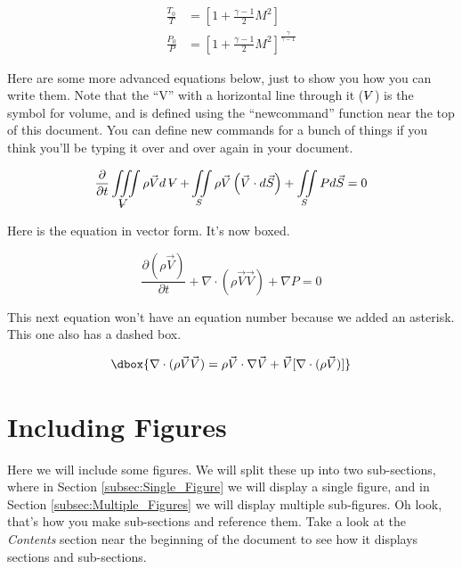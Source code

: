 \documentclass[letterpaper,12pt]{article}
\newcommand\dboxed[1]{\dbox{\ensuremath{#1}}}
\newcommand{\volume}{\mathop{\ooalign{\hfil$V$\hfil\cr\kern0.08em--\hfil\cr}}\nolimits}
\begin{document}
\begin{equation}
\begin{aligned}
	\frac{T_0}{T} &= \left[1+\frac{\gamma-1}{2}M^2\right] \\
	\frac{P_0}{P} &= \left[1+\frac{\gamma-1}{2}M^2\right]^{\frac{\gamma}{\gamma-1}}
\end{aligned}
\end{equation}

Here are some more advanced equations below, just to show you how you can write them.  Note that the ``V'' with a horizontal line through it ($\volume$) is the symbol for volume, and is defined using the ``newcommand'' function near the top of this document.  You can define new commands for a bunch of things if you think you'll be typing it over and over again in your document.

\begin{equation}
	\frac{\partial}{\partial t} \iiint\limits_{\volume} \rho \vec{V} d\volume + \iint\limits_S \rho \vec{V} \left(\vec{V} \cdot d\vec{S}\right) + \iint\limits_S P d\vec{S} = 0
\end{equation}

\noindent Here is the equation in vector form.  It's now boxed.

\begin{equation}
	\boxed{\frac{\partial (\rho \vec{V})}{\partial t} + \nabla \cdot (\rho \vec{V} \vec{V}) + \nabla P = 0}
\end{equation}

\noindent This next equation won't have an equation number because we added an asterisk.  This one also has a dashed box.

\begin{equation*}
	\dboxed{\nabla \cdot (\rho \vec{V} \vec{V}) = \rho \vec{V} \cdot \nabla \vec{V} + \vec{V}[\nabla \cdot (\rho \vec{V})]}
\end{equation*}

\section{Including Figures}
\label{sec:Including_Figures}

Here we will include some figures.  We will split these up into two sub-sections, where in Section \ref{subsec:Single_Figure} we will display a single figure, and in Section \ref{subsec:Multiple_Figures} we will display multiple sub-figures.  Oh look, that's how you make sub-sections and reference them.  Take a look at the \textit{Contents} section near the beginning of the document to see how it displays sections and sub-sections.
\end{document}
